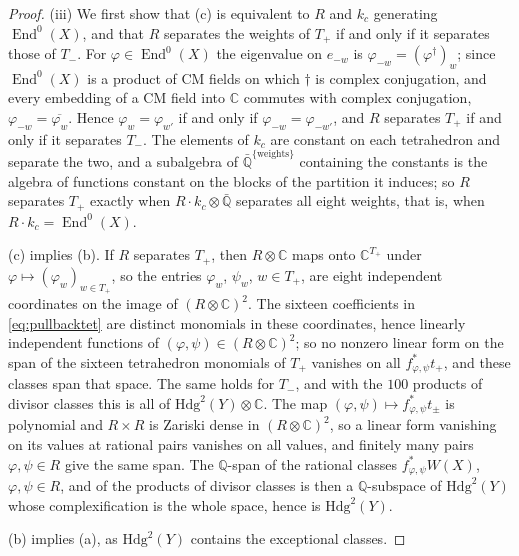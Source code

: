 \documentclass[11pt,reqno]{amsart}
\theoremstyle{plain}
\theoremstyle{definition}
\theoremstyle{remark}
\newcommand{\QQ}{\mathbb{Q}}
\newcommand{\CC}{\mathbb{C}}
\newcommand{\Hdg}{\mathrm{Hdg}}
\newcommand{\HW}{W}                      %
\DeclareMathOperator{\End}{End}
\newcommand{\bbar}[1]{\overline{#1}}
\begin{document}
\begin{proof}
(iii) We first show that (c) is equivalent to $R$ and $k_{c}$ generating
$\End^{0}(X)$, and that $R$ separates the weights of $T_{+}$ if and only if
it separates those of $T_{-}$. For $\varphi\in\End^{0}(X)$ the eigenvalue on
$e_{-w}$ is $\varphi_{-w}=(\varphi^{\dagger})_{w}$; since $\End^{0}(X)$ is a
product of CM fields on which $\dagger$ is complex conjugation, and every
embedding of a CM field into $\CC$ commutes with complex conjugation,
$\varphi_{-w}=\bbar{\varphi_{w}}$. Hence $\varphi_{w}=\varphi_{w'}$ if and
only if $\varphi_{-w}=\varphi_{-w'}$, and $R$ separates $T_{+}$ if and only
if it separates $T_{-}$. The elements of $k_{c}$ are constant on each
tetrahedron and separate the two, and a subalgebra of
$\bar{\QQ}^{\{\text{weights}\}}$ containing the constants is the algebra of
functions constant on the blocks of the partition it induces; so $R$
separates $T_{+}$ exactly when $R\cdot k_{c}\otimes\bar{\QQ}$ separates all
eight weights, that is, when $R\cdot k_{c}=\End^{0}(X)$.

(c) implies (b). If $R$ separates $T_{+}$, then $R\otimes\CC$ maps onto
$\CC^{T_{+}}$ under $\varphi\mapsto(\varphi_{w})_{w\in T_{+}}$, so the
entries $\varphi_{w}$, $\psi_{w}$, $w\in T_{+}$, are eight independent
coordinates on the image of $(R\otimes\CC)^{2}$. The sixteen coefficients in
\eqref{eq:pullbacktet} are distinct monomials in these coordinates, hence
linearly independent functions of $(\varphi,\psi)\in(R\otimes\CC)^{2}$; so
no nonzero linear form on the span of the sixteen tetrahedron monomials of
$T_{+}$ vanishes on all $f_{\varphi,\psi}^{*}t_{+}$, and these classes span
that space. The same holds for $T_{-}$, and with the $100$ products of
divisor classes this is all of $\Hdg^{2}(Y)\otimes\CC$. The map
$(\varphi,\psi)\mapsto f_{\varphi,\psi}^{*}t_{\pm}$ is polynomial and
$R\times R$ is Zariski dense in $(R\otimes\CC)^{2}$, so a linear form
vanishing on its values at rational pairs vanishes on all values, and
finitely many pairs $\varphi,\psi\in R$ give the same span. The $\QQ$-span of
the rational classes $f_{\varphi,\psi}^{*}\HW(X)$, $\varphi,\psi\in R$, and
of the products of divisor classes is then a $\QQ$-subspace of
$\Hdg^{2}(Y)$ whose complexification is the whole space, hence is
$\Hdg^{2}(Y)$.

(b) implies (a), as $\Hdg^{2}(Y)$ contains the exceptional classes.


\end{proof}
\end{document}
